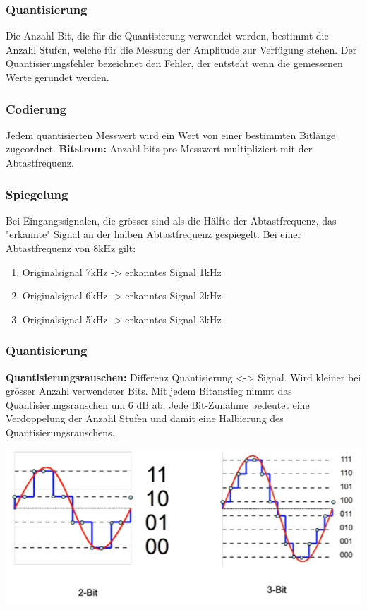 \subsubsection{Quantisierung}
Die Anzahl Bit, die für die Quantisierung verwendet werden, bestimmt die Anzahl Stufen, welche für die Messung der Amplitude zur Verfügung stehen.
Der Quantisierungsfehler bezeichnet den Fehler, der entsteht wenn die gemessenen Werte gerundet werden.
\subsubsection{Codierung}
Jedem quantisierten Messwert wird ein Wert von einer bestimmten Bitlänge zugeordnet. \textbf{Bitstrom: } Anzahl bits pro Messwert multipliziert mit der Abtastfrequenz.

\subsubsection{Spiegelung}
Bei Eingangssignalen, die grösser sind als die Hälfte der Abtastfrequenz, das "erkannte" Signal an der halben Abtastfrequenz gespiegelt. Bei einer Abtastfrequenz von 8kHz gilt:
\begin{enumerate}
    \item Originalsignal 7kHz -> erkanntes Signal 1kHz
    \item Originalsignal 6kHz -> erkanntes Signal 2kHz
    \item Originalsignal 5kHz -> erkanntes Signal 3kHz
\end{enumerate}

\subsubsection{Quantisierung}%
\textbf{Quantisierungsrauschen: } Differenz Quantisierung <-> Signal. Wird kleiner bei grösser Anzahl verwendeter Bits. Mit jedem Bitanstieg nimmt das Quantisierungsrauschen um 6 dB ab. Jede Bit-Zunahme bedeutet eine Verdoppelung der Anzahl Stufen und damit eine Halbierung des Quantisierungsrauschens.

\begin{center}
    \includegraphics[width=1\linewidth]{images/quantisierungsrauschen.png}
\end{center}

